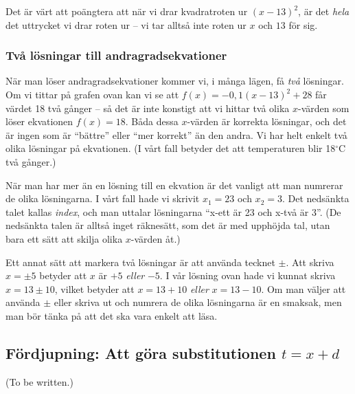 Det är värt att poängtera att när vi drar kvadratroten ur $(x-13)^2$, är det \emph{hela} det uttrycket vi drar roten ur -- vi tar alltså inte roten ur $x$ och $13$ för sig.

\subsubsection{Två lösningar till andragradsekvationer}

När man löser andragradsekvationer kommer vi, i många lägen, få \emph{två} lösningar.
Om vi tittar på grafen ovan kan vi se att $f(x) = -0,1(x-13)^2+28$ får värdet 18 två gånger -- så det är inte konstigt att vi hittar två olika $x$-värden som löser ekvationen $f(x)=18$.
Båda dessa $x$-värden är korrekta lösningar, och det är ingen som är ``bättre'' eller ``mer korrekt'' än den andra.
Vi har helt enkelt två olika lösningar på ekvationen.
(I vårt fall betyder det att temperaturen blir 18$^{\circ}$C två gånger.)

När man har mer än en lösning till en ekvation är det vanligt att man numrerar de olika lösningarna.
I vårt fall hade vi skrivit $x_1=23$ och $x_2=3$.
Det nedsänkta talet kallas \emph{index}, och man uttalar lösningarna ``x-ett är 23 och x-två är 3''.
(De nedsänkta talen är alltså inget räknesätt, som det är med upphöjda tal, utan bara ett sätt att skilja olika $x$-värden åt.)

Ett annat sätt att markera två lösningar är att använda tecknet $\pm$.
Att skriva $x=\pm 5$ betyder att $x$ är $+5$ \emph{eller} $-5$.
I vår lösning ovan hade vi kunnat skriva $x=13 \pm 10$, vilket betyder att $x=13+10$ \emph{eller} $x=13-10$.
Om man väljer att använda $\pm$ eller skriva ut och numrera de olika lösningarna är en smaksak, men man bör tänka på att det ska vara enkelt att läsa.

\subsection{Fördjupning: Att göra substitutionen $t = x + d$}

(To be written.)
